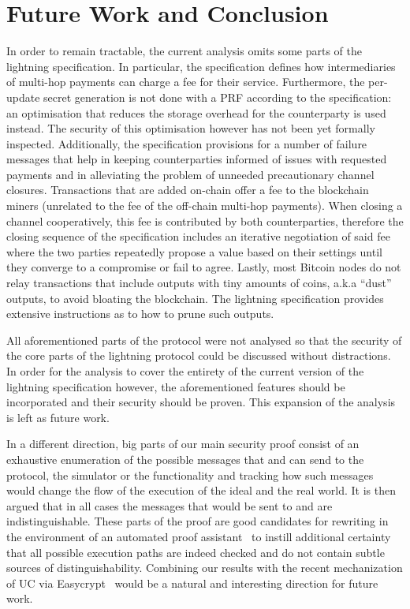 \section{Future Work and Conclusion}
  In order to remain tractable, the current analysis omits some parts of
  the lightning specification. In particular, the specification defines how
  intermediaries of multi-hop payments can charge a fee for their service.
  Furthermore, the per-update secret generation is not done with a PRF according
  to the specification: an optimisation that reduces the storage overhead for
  the counterparty is used instead. The security of this optimisation however
  has not been yet formally inspected. Additionally, the specification
  provisions for a number of failure messages that help in keeping
  counterparties informed of issues with requested payments and in alleviating
  the problem of unneeded precautionary channel closures. Transactions
  that are added on-chain offer a fee to the blockchain miners (unrelated to the
  fee of the off-chain multi-hop payments). When closing a channel
  cooperatively, this fee is contributed by both counterparties, therefore the
  closing sequence of the specification includes an iterative negotiation of
  said fee where the two parties repeatedly propose a value based on their
  settings until they converge to a compromise or fail to agree. Lastly, most
  Bitcoin nodes do not relay transactions that include outputs with tiny amounts
  of coins, a.k.a ``dust'' outputs, to avoid bloating the blockchain. The
  lightning specification provides extensive instructions as to how to prune
  such outputs.

  All aforementioned parts of the protocol were not analysed so that the
  security of the core parts of the lightning protocol could be discussed
  without distractions. In order for the analysis to cover the entirety of the
  current version of the lightning specification however, the aforementioned
  features should be incorporated and their security should be proven. This
  expansion of the analysis is left as future work.

  In a different direction, big parts of our main security proof consist
  of an exhaustive enumeration of the possible messages that \environment{} and
  \adversary{} can send to the protocol, the simulator or the functionality and
  tracking how such messages would change the flow of the execution of the ideal
  and the real world. It is then argued that in all cases the messages that
  would be sent to \environment{} and \adversary{} are indistinguishable. These
  parts of the proof are good candidates for rewriting in the environment of an
  automated proof assistant~\cite{mccarthy} to instill additional certainty that
  all possible execution paths are indeed checked and do not contain subtle
  sources of distinguishability. %
Combining our results with the recent  mechanization of UC via Easycrypt~\cite{DBLP:conf/csfw/CanettiSV19} would be a natural and interesting direction for future work. 
  

